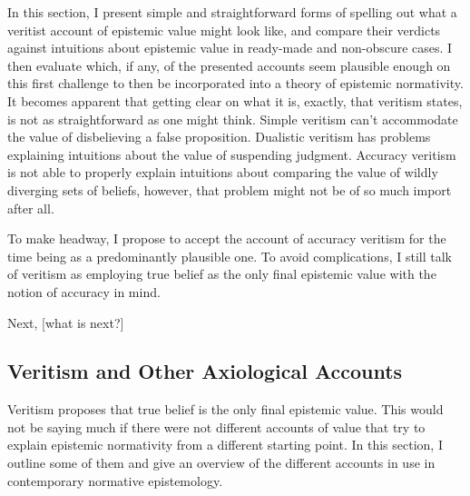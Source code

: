 \documentclass[12pt,numbers=noenddot]{scrartcl}
\begin{document}
In this section, I present simple and straightforward forms of spelling out what a veritist account of epistemic value might look like, and compare their verdicts against intuitions about epistemic value in ready-made and non-obscure cases. I then evaluate which, if any, of the presented accounts seem plausible enough on this first challenge to then be incorporated into a theory of epistemic normativity. It becomes apparent that getting clear on what it is, exactly, that veritism states, is not as straightforward as one might think. Simple veritism can't accommodate the value of disbelieving a false proposition. Dualistic veritism has problems explaining intuitions about the value of suspending judgment. Accuracy veritism is not able to properly explain intuitions about comparing the value of wildly diverging sets of beliefs, however, that problem might not be of so much import after all.

To make headway, I propose to accept the account of accuracy veritism for the time being as a predominantly plausible one. To avoid complications, I still talk of veritism as employing true belief as the only final epistemic value with the notion of accuracy in mind.

Next, [what is next?]

\subsection{Veritism and Other Axiological Accounts}

Veritism proposes that true belief is the only final epistemic value. This would not be saying much if there were not different accounts of value that try to explain epistemic normativity from a different starting point. In this section, I outline some of them and give an overview of the different accounts in use in contemporary normative epistemology.
\end{document}

